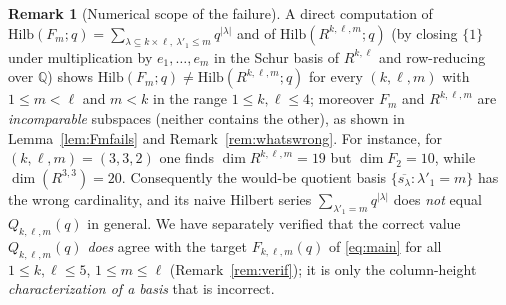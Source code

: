 \documentclass{amsart}
\theoremstyle{definition}
\newtheorem{remark}{Remark}
\newcommand{\Hilb}{\mathrm{Hilb}}
\newcommand{\Q}{\mathbb{Q}}
\newcommand{\rkl}{R^{k,\ell}}
\newcommand{\Rklm}{R^{k,\ell,m}}
\begin{document}
\begin{remark}[Numerical scope of the failure]\label{rem:Fmnumerics}
A direct computation of $\Hilb(F_m;q)=\sum_{\lambda\subseteq k\times\ell,\
\lambda'_1\le m}q^{|\lambda|}$ and of $\Hilb(\Rklm;q)$ (by closing $\{1\}$ under
multiplication by $e_1,\dots,e_m$ in the Schur basis of $\rkl$ and row-reducing over
$\Q$) shows $\Hilb(F_m;q)\neq\Hilb(\Rklm;q)$ for every $(k,\ell,m)$ with
$1\le m<\ell$ and $m<k$ in the range $1\le k,\ell\le4$; moreover $F_m$ and $\Rklm$
are \emph{incomparable} subspaces (neither contains the other), as shown in
Lemma~\ref{lem:Fmfails} and Remark~\ref{rem:whatswrong}. For instance, for
$(k,\ell,m)=(3,3,2)$ one finds $\dim\Rklm=19$ but $\dim F_2=10$, while
$\dim(R^{3,3})=20$. Consequently the would-be quotient basis
$\{\overline{s_\lambda}:\lambda'_1=m\}$ has the wrong cardinality, and its naive
Hilbert series $\sum_{\lambda'_1=m}q^{|\lambda|}$ does \emph{not} equal
$Q_{k,\ell,m}(q)$ in general. We have separately verified that the correct value
$Q_{k,\ell,m}(q)$ \emph{does} agree with the target $F_{k,\ell,m}(q)$ of
\eqref{eq:main} for all $1\le k,\ell\le5$, $1\le m\le\ell$ (Remark~\ref{rem:verif});
it is only the column-height \emph{characterization of a basis} that is incorrect.
\end{remark}
\end{document}
